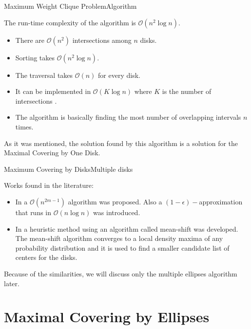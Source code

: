 \documentclass{beamer}
\newcommand{\bigO}{\mathscr{O}}
\begin{document}
\begin{frame}{Maximum Weight Clique Problem}{Algorithm}
	
	The run-time complexity of the algorithm is $\bigO(n^2\log{n})$.
	
	\begin{itemize}
		\item There are $\bigO(n^2)$ intersections among $n$ disks.
		
		\item Sorting takes $\bigO(n^2\log{n})$.
		
		\item The traversal takes $\bigO(n)$ for every disk.
		
		\item It can be implemented in $\bigO(K\log{n})$ where $K$ is the number of intersections \autocite{bentley:1979}.
		
		\item The algorithm is basically finding the most number of overlapping intervals $n$ times.

	\end{itemize}
	As it was mentioned, the solution found by this algorithm is a solution for the Maximal Covering by One Disk.

\end{frame}

\begin{frame}{Maximum Covering by Disks}{Multiple disks}
	
	Works found in the literature:
	
	\begin{itemize}
		\item In \autocite{cabello:2006} a $\bigO(n^{2m-1})$ algorithm was proposed. Also a $(1-\epsilon)-$approximation that runs in $\bigO(n\log{n})$ was introduced.
		
		\item In \autocite{zhou} a heuristic method using an algorithm called mean-shift was developed. The mean-shift algorithm converges to a local density maxima of any probability distribution and it is used to find a smaller candidate list of centers for the disks.
	\end{itemize}
	
	Because of the similarities, we will discuss only the multiple ellipses algorithm later.
	
\end{frame}
\section{Maximal Covering by Ellipses}
\end{document}
